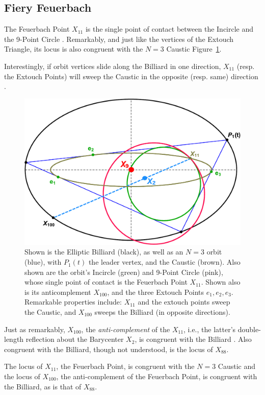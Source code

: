 \subsection{Fiery Feuerbach}

The Feuerbach Point $X_{11}$ is the single point of contact between the Incircle and the 9-Point Circle \cite{mw}. Remarkably, and just like the vertices of the Extouch Triangle, its locus is also congruent with the $N=3$ Caustic Figure~\ref{fig:feuer_loci}.

Interestingly, if orbit vertices slide along the Billiard in one direction, $X_{11}$ (resp. the Extouch Points) will sweep the Caustic in the opposite (resp. same) direction \cite[video \#2]{dsr_main_videos_2019}.
%
\begin{figure}[H]
    \centering
    \includegraphics[width=.60\textwidth]{pics/0035_feuerbach_loci.pdf}
    \caption{Shown is the Elliptic Billiard (black), as well as an $N=3$ orbit (blue), with $P_1(t)$ the leader vertex, and the Caustic (brown). Also shown are the orbit's Incircle (green) and 9-Point Circle (pink), whose single point of contact is the Feuerbach Point $X_{11}$. Shown also is its anticomplement $X_{100}$, and the three Extouch Points $e_1,e_2,e_3$. Remarkable properties include: $X_{11}$ and the extouch points sweep the Caustic, and $X_{100}$ sweeps the Billiard (in opposite directions).}
    \label{fig:feuer_loci}
\end{figure}

Just as remarkably, $X_{100}$, the {\em anti-complement} \cite{mw} of the $X_{11}$, i.e., the latter's double-length reflection about the Barycenter $X_2$, is congruent with the Billiard \cite[video \#4]{dsr_main_videos_2019}. Also congruent with the Billiard, though not understood, is the locus of $X_{88}$.

\begin{observation}
The locus of $X_{11}$, the Feuerbach Point, is congruent with the $N=3$ Caustic and the locus of $X_{100}$, the anti-complement of the Feuerbach Point, is congruent with the Billiard, as is that of $X_{88}$.
\end{observation}


